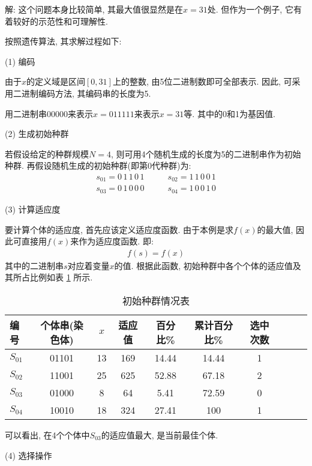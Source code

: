 解: 这个问题本身比较简单, 其最大值很显然是在$x=31$处. 但作为一个例子, 它有着较好的示范性和可理解性.

按照遗传算法, 其求解过程如下:

    (1) 编码

    由于$x$的定义域是区间$[0,31]$上的整数, 由5位二进制数即可全部表示. 因此, 可采用二进制编码方法, 其编码串的长度为5.

    \begin{example}
        用二进制串00000来表示$x=011111$来表示$x=31$等. 其中的0和1为基因值.
    \end{example}

    (2) 生成初始种群

    若假设给定的种群规模$N=4$, 则可用4个随机生成的长度为5的二进制串作为初始种群. 再假设随机生成的初始种群(即第0代种群)为:
\begin{align*}
  s_{01}=0\,  1\,  1\,  0\,  1 \qquad    & s_{02}=1\,  1\,  0\,  0\,  1\\
  s_{03}=0\,  1\,  0\,  0\,  0 \qquad    &  s_{04}=1\,  0\,  0\,  1\,  0
\end{align*}

 (3) 计算适应度

要计算个体的适应度, 首先应该定义适应度函数. 由于本例是求$f(x)$的最大值, 因此可直接用$f(x)$来作为适应度函数. 即:
\begin{align}
    f(s)=f(x)
\end{align}
其中的二进制串$s$对应着变量$x$的值. 根据此函数, 初始种群中各个个体的适应值及其所占比例如表 \ref{AI_table2019112802} 所示.
\begin{table}[H]
\caption{初始种群情况表}
\begin{center}
\begin{tabular} {lccccccccc}
  \hline
编号&个体串(染色体)&	$x$	&适应值&	百分比\%&	累计百分比\%&	选中次数\\
\hline
$S_{01}$&     01101&	13&	169&	14.44&	14.44&	1\\
$S_{02}$&	11001&	25&	625&	52.88&	67.18&	2\\
$S_{03}$&	01000&	8&	64&	5.41&	72.59&	0\\
$S_{04}$&	10010&	18&	324&	27.41&	100&	1\\
\hline
\end{tabular}
\end{center}
\label{AI_table2019112802}
\end{table}
可以看出, 在4个个体中$S_{03}$的适应值最大, 是当前最佳个体.

(4) 选择操作

